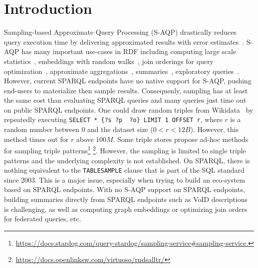 
\section{Introduction}

Sampling-based Approximate Query Processing (S-AQP) drastically reduces query
execution time by delivering approximated results with error
estimates~\cite{DBLP:conf/sigmod/AgarwalMKTJMMS14}. S-AQP has many important use-cases in RDF including
computing large scale
statistics~\cite{soulet2019anytime,10.1007/978-3-319-18818-8_14},
embeddings with random walks~\cite{ristoski2016rdf2vec}, join
orderings for query optimization~\cite{DBLP:conf/cidr/LeisRGK017},
approximate
aggregations~\cite{wang2022approximate},
summaries~\cite{10.1007/978-3-030-49461-2_10}, exploratory
queries~\cite{DBLP:conf/sigmod/AgarwalMKTJMMS14}.
%
However, current SPARQL endpoints have no native support for S-AQP,
pushing end-users to materialize then sample
results. Consequenly, sampling has at least  the same cost than evaluating
SPARQL queries and many queries just time out on public SPARQL
endpoints.
%
One could draw random triples from Wikidata~\cite{soulet2019anytime}
by repeatedly executing \lstinline[language=SPARQL]|SELECT * {?s ?p  ?o} LIMIT 1 OFFSET r|,
where $r$ is a random number between $0$ and
the dataset size ($0<r<12B$). However, this method times out for $r$
above $100M$. Some triple stores propose ad-hoc methods for sampling
triple
patterns\footnote{\url{https://docs.stardog.com/query-stardog/sampling-service\#sampling-service.}}
\footnote{\url{https://docs.openlinksw.com/virtuoso/rndsalltr/}}.
However, the sampling is limited to single triple patterns and the
underlying complexity is not established.  On SPARQL, there is nothing
equivalent to the \texttt{TABLESAMPLE} clause that is part of the SQL
standard since 2003. This is a major issue, especially when trying to
build an eco-system based on SPARQL endpoints. With no S-AQP support
on SPARQL endpoints, building summaries directly from SPARQL endpoints
such as VoID descriptions is challenging, as well as computing graph
embeddings or optimizing join orders for federated queries, etc.


